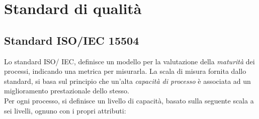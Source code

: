 \section{Standard di qualità}

\subsection{Standard ISO/IEC 15504}
\label{std15504}
Lo standard ISO\glossario/ IEC, definisce un modello per la valutazione della \textit{maturità} dei processi, indicando una metrica per misurarla. La scala di misura fornita dallo standard, si basa sul principio che un'alta \textit{capacità di processo}\glossario{} è associata ad un miglioramento prestazionale dello stesso.
\\Per ogni processo, si definisce un livello di capacità, basato sulla seguente scala a sei livelli, ognuno con i propri attributi:
